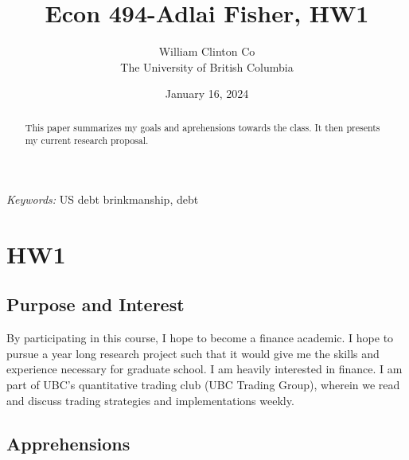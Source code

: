 \documentclass[
  12pt]{article}
\begin{document}
\def\spacingset#1{\renewcommand{\baselinestretch}%
{#1}\small\normalsize} \spacingset{1}



\date{January 16, 2024}
\title{\bf Econ 494-Adlai Fisher, HW1}
\author{
William Clinton Co\\
The University of British Columbia\\
}
\maketitle

\bigskip
\bigskip
\begin{abstract}
This paper summarizes my goals and aprehensions towards the class. It
then presents my current research proposal.
\end{abstract}

\noindent%
{\it Keywords:} US debt brinkmanship, debt
\vfill

\newpage
\spacingset{1.9} %
\ifdefined\Shaded\renewenvironment{Shaded}{\begin{tcolorbox}[enhanced, sharp corners, interior hidden, frame hidden, borderline west={3pt}{0pt}{shadecolor}, breakable, boxrule=0pt]}{\end{tcolorbox}}\fi

\hypertarget{sec-l}{%
\section{HW1}\label{sec-l}}

\hypertarget{purpose-and-interest}{%
\subsection{Purpose and Interest}\label{purpose-and-interest}}

By participating in this course, I hope to become a finance academic. I
hope to pursue a year long research project such that it would give me
the skills and experience necessary for graduate school. I am heavily
interested in finance. I am part of UBC's quantitative trading club (UBC
Trading Group), wherein we read and discuss trading strategies and
implementations weekly.

\hypertarget{apprehensions}{%
\subsection{Apprehensions}\label{apprehensions}}
\end{document}
